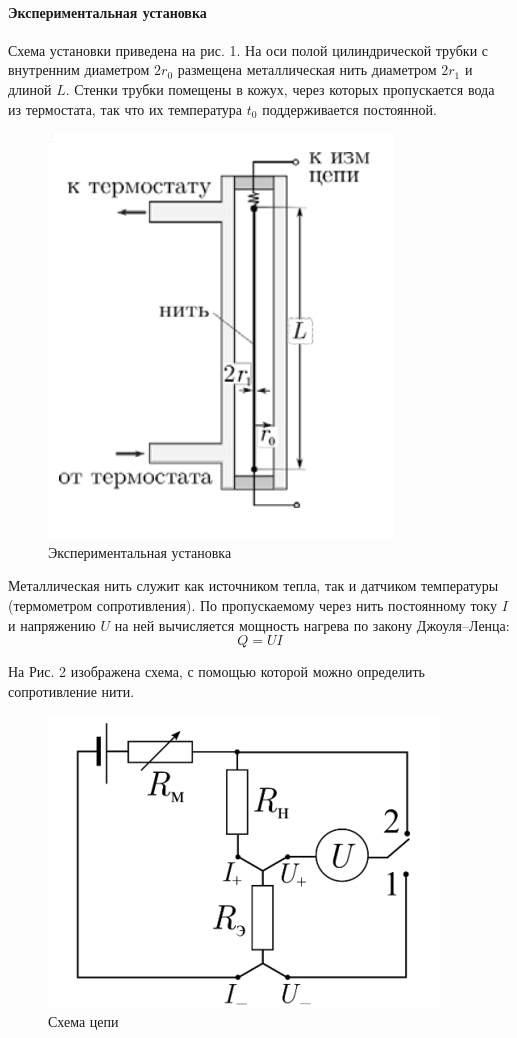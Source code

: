 \documentclass[a4paper,12pt]{article}
\begin{document}
\paragraph{Экспериментальная установка\\}
Схема установки приведена на рис. 1. На оси
полой цилиндрической трубки с внутренним
диаметром $2r_0$ размещена металлическая нить диаметром $2r_1$ и длиной $L$. Стенки трубки помещены в кожух, через которых пропускается вода из термостата, так что их температура $t_0$ поддерживается постоянной. 
\begin{figure}[h]
    \centering
    \includegraphics[width=0.5\linewidth]{Установка.png}
    \caption{Экспериментальная установка}
    \label{fig:my_label}
\end{figure}

Металлическая нить служит как источником тепла, так и датчиком температуры (термометром сопротивления). По пропускаемому через нить постоянному току $I$ и напряжению $U$ на ней вычисляется мощность нагрева по закону Джоуля–Ленца:
\begin{equation}
    Q=UI
\end{equation}

На Рис. 2 изображена схема, с помощью которой можно определить сопротивление нити.

\begin{figure}[h]
    \centering
    \includegraphics[width=0.5\linewidth]{схема.png}
    \caption{Схема цепи}
    \label{fig:my_label}
\end{figure}
\newpage
\end{document}
